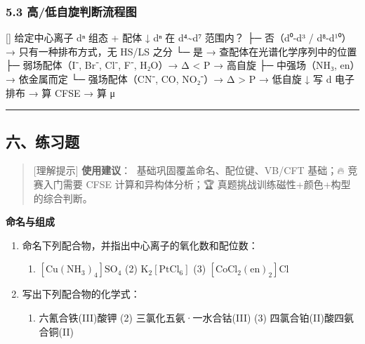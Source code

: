 \documentclass[a4paper,11pt]{ctexart}
\providecommand{\tightlist}{\setlength{\itemsep}{0pt}\setlength{\parskip}{0pt}}
\newenvironment{Shaded}{}{}
\newenvironment{Highlighting}{}{}
\newcommand{\NormalTok}[1]{#1}
\newcommand{\箭}{\ensuremath{\rightarrow}}
\newcommand{\左箭}{\ensuremath{\leftarrow}}
\newcommand{\上箭}{\ensuremath{\uparrow}}
\newcommand{\下箭}{\ensuremath{\downarrow}}
\newcommand{\衡}{\ensuremath{\rightleftharpoons}}
\newcommand{\双箭}{\ensuremath{\leftrightarrow}}
\newcommand{\约等于}{\ensuremath{\approx}}
\newcommand{\小于等于}{\ensuremath{\leq}}
\newcommand{\大于等于}{\ensuremath{\geq}}
\newcommand{\不等于}{\ensuremath{\neq}}
\newcommand{\西格马}{\ensuremath{\sigma}}
\newcommand{\派}{\ensuremath{\pi}}
\begin{document}
\subsubsection{5.3 高/低自旋判断流程图}\label{ux9ad8ux4f4eux81eaux65cbux5224ux65adux6d41ux7a0bux56fe}

\begin{Shaded}
\begin{Highlighting}[]
\NormalTok{给定中心离子 dⁿ 组态 + 配体}
\NormalTok{    ↓}
\NormalTok{dⁿ 在 d⁴\textasciitilde{}d⁷ 范围内？}
\NormalTok{├─ 否（d⁰{-}d³ / d⁸{-}d¹⁰）→ 只有一种排布方式，无 HS/LS 之分}
\NormalTok{└─ 是 → 查配体在光谱化学序列中的位置}
\NormalTok{    ├─ 弱场配体（I⁻, Br⁻, Cl⁻, F⁻, H₂O）→ Δ \textless{} P → 高自旋}
\NormalTok{    ├─ 中强场（NH₃, en）→ 依金属而定}
\NormalTok{    └─ 强场配体（CN⁻, CO, NO₂⁻）→ Δ \textgreater{} P → 低自旋}
\NormalTok{        ↓}
\NormalTok{写 d 电子排布 → 算 CFSE → 算 μ}
\end{Highlighting}
\end{Shaded}

\begin{center}\rule{0.5\linewidth}{0.5pt}\end{center}

\subsection{六、练习题}\label{ux516dux7ec3ux4e60ux9898}

\begin{quote}
{[}理解提示{]} \textbf{使用建议}：🌱 基础巩固覆盖命名、配位键、VB/CFT 基础；🔥 竞赛入门需要 CFSE 计算和异构体分析；🏆 真题挑战训练磁性+颜色+构型的综合判断。
\end{quote}

\textbf{命名与组成}

\begin{enumerate}
\def\labelenumi{\arabic{enumi}.}
\tightlist
\item
  命名下列配合物，并指出中心离子的氧化数和配位数：

  \begin{enumerate}
  \def\labelenumii{(\arabic{enumii})}
  \tightlist
  \item
    \(\mathrm{[Cu(NH_3)_4]SO_4}\) (2) \(\mathrm{K_2[PtCl_6]}\) (3) \(\mathrm{[CoCl_2(en)_2]Cl}\)
  \end{enumerate}
\item
  写出下列配合物的化学式：

  \begin{enumerate}
  \def\labelenumii{(\arabic{enumii})}
  \tightlist
  \item
    六氰合铁(III)酸钾 (2) 三氯化五氨·一水合钴(III) (3) 四氯合铂(II)酸四氨合铜(II)
  \end{enumerate}
\end{enumerate}
\end{document}
